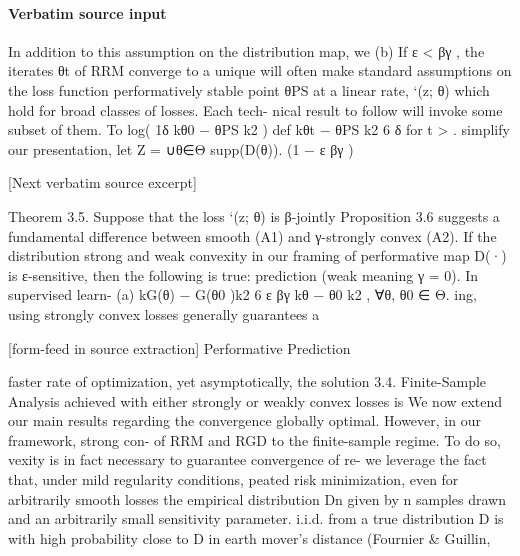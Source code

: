 \documentclass[10pt]{article}
\begin{document}
\paragraph{Verbatim source input}
\begin{ReviewVerbatim}
In addition to this assumption on the distribution map, we          (b) If ε < βγ , the iterates θt of RRM converge to a unique
will often make standard assumptions on the loss function               performatively stable point θPS at a linear rate,
`(z; θ) which hold for broad classes of losses. Each tech-
nical result to follow will invoke some subset of them. To                                                log( 1δ kθ0 − θPS k2 )
                                 def                                         kθt − θPS k2 6 δ for t >                              .
simplify our presentation, let Z = ∪θ∈Θ supp(D(θ)).                                                             (1 − ε βγ )

[Next verbatim source excerpt]

Theorem 3.5. Suppose that the loss `(z; θ) is β-jointly
                                                                   Proposition 3.6 suggests a fundamental difference between
smooth (A1) and γ-strongly convex (A2). If the distribution
                                                                   strong and weak convexity in our framing of performative
map D(·) is ε-sensitive, then the following is true:
                                                                   prediction (weak meaning γ = 0). In supervised learn-
(a) kG(θ) − G(θ0 )k2 6 ε βγ kθ − θ0 k2 , ∀θ, θ0 ∈ Θ.               ing, using strongly convex losses generally guarantees a

[form-feed in source extraction]
                                                           Performative Prediction

faster rate of optimization, yet asymptotically, the solution                 3.4. Finite-Sample Analysis
achieved with either strongly or weakly convex losses is
                                                                              We now extend our main results regarding the convergence
globally optimal. However, in our framework, strong con-
                                                                              of RRM and RGD to the ﬁnite-sample regime. To do so,
vexity is in fact necessary to guarantee convergence of re-
                                                                              we leverage the fact that, under mild regularity conditions,
peated risk minimization, even for arbitrarily smooth losses
                                                                              the empirical distribution Dn given by n samples drawn
and an arbitrarily small sensitivity parameter.
                                                                              i.i.d. from a true distribution D is with high probability
                                                                              close to D in earth mover’s distance (Fournier & Guillin,
\end{ReviewVerbatim}
\end{document}

